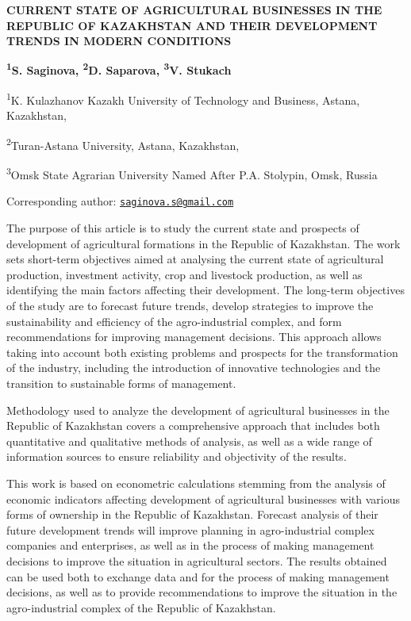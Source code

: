 


{\bfseries CURRENT STATE OF AGRICULTURAL BUSINESSES IN THE REPUBLIC OF
KAZAKHSTAN AND THEIR DEVELOPMENT TRENDS IN MODERN CONDITIONS}

{\bfseries \textsuperscript{1}S. Saginova\textsuperscript{\envelope },
\textsuperscript{2}D. Saparova, \textsuperscript{3}V. Stukach}

\textsuperscript{1}K. Kulazhanov Kazakh University of Technology and
Business, Astana, Kazakhstan,

\textsuperscript{2}Turan-Astana University, Astana, Kazakhstan,

\textsuperscript{3}Omsk State Agrarian University Named After P.A.
Stolypin, Omsk, Russia

{\bfseries \textsuperscript{\envelope }}Corresponding author:
\href{mailto:saginova.s@gmail.com}{\nolinkurl{saginova.s@gmail.com}}

The purpose of this article is to study the current state and prospects
of development of agricultural formations in the Republic of Kazakhstan.
The work sets short-term objectives aimed at analysing the current state
of agricultural production, investment activity, crop and livestock
production, as well as identifying the main factors affecting their
development. The long-term objectives of the study are to forecast
future trends, develop strategies to improve the sustainability and
efficiency of the agro-industrial complex, and form recommendations for
improving management decisions. This approach allows taking into account
both existing problems and prospects for the transformation of the
industry, including the introduction of innovative technologies and the
transition to sustainable forms of management.

Methodology used to analyze the development of agricultural businesses
in the Republic of Kazakhstan covers a comprehensive approach that
includes both quantitative and qualitative methods of analysis, as well
as a wide range of information sources to ensure reliability and
objectivity of the results.

This work is based on econometric calculations stemming from the
analysis of economic indicators affecting development of agricultural
businesses with various forms of ownership in the Republic of
Kazakhstan. Forecast analysis of their future development trends will
improve planning in agro-industrial complex companies and enterprises,
as well as in the process of making management decisions to improve the
situation in agricultural sectors. The results obtained can be used both
to exchange data and for the process of making management decisions, as
well as to provide recommendations to improve the situation in the
agro-industrial complex of the Republic of Kazakhstan.


